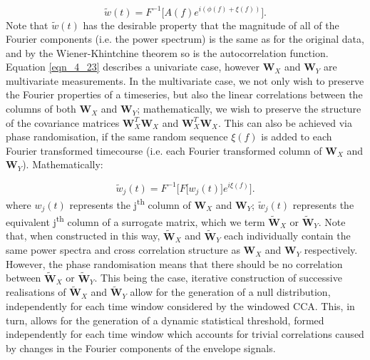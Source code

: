 \begin{equation}
\tilde{w}(t) = F^{-1}\Big[A(f)e^{i(\phi(f)+\xi(f))}\Big]. \label{eqn_4_23}
\end{equation} Note that $\tilde{w}(t)$ has the desirable property that the magnitude of all of the Fourier components (i.e. the power spectrum) is the same as for the original data, and by the Wiener-Khintchine theorem \citep{Prichard1994} so is the autocorrelation function. Equation \ref{eqn_4_23} describes a univariate case, however $\mathbf{W}_{X}$ and $\mathbf{W}_{Y}$ are multivariate measurements. In the multivariate case, we not only wish to preserve the Fourier properties of a timeseries, but also the linear correlations between the columns of both $\mathbf{W}_{X}$ and $\mathbf{W}_{Y}$; mathematically, we wish to preserve the structure of the covariance matrices $\mathbf{W}_{X}^T\mathbf{W}_{X}$ and $\mathbf{W}_{X}^T\mathbf{W}_{X}$. This can also be achieved via phase randomisation, if the same random sequence $\xi(f)$ is added to each Fourier transformed timecourse (i.e. each Fourier transformed column of $\mathbf{W}_{X}$ and $\mathbf{W}_{Y}$). Mathematically:

\begin{equation}
\tilde{w}_j(t) = F^{-1}\Big[F\big[w_j(t)\big]e^{i\xi(f)}\Big]. \label{eqn_4_24}
\end{equation} where $w_j(t)$ represents the j\textsuperscript{th} column of $\mathbf{W}_{X}$ and $\mathbf{W}_{Y}$; $\tilde{w}_j(t)$ represents the equivalent j\textsuperscript{th} column of a surrogate matrix, which we term $\tilde{\mathbf{W}}_{X}$ or $\tilde{\mathbf{W}}_{Y}$. Note that, when constructed in this way, $\tilde{\mathbf{W}}_{X}$ and $\tilde{\mathbf{W}}_{Y}$ each individually contain the same power spectra and cross correlation structure as $\mathbf{W}_{X}$ and $\mathbf{W}_{Y}$ respectively. However, the phase randomisation means that there should be no correlation between $\tilde{\mathbf{W}}_{X}$ or $\tilde{\mathbf{W}}_{Y}$. This being the case, iterative construction of successive realisations of  $\tilde{\mathbf{W}}_{X}$ and $\tilde{\mathbf{W}}_{Y}$ allow for the generation of a null distribution, independently for each time window considered by the windowed CCA. This, in turn, allows for the generation of a dynamic statistical threshold, formed independently for each time window which accounts for trivial correlations caused by changes in the Fourier components of the envelope signals.

